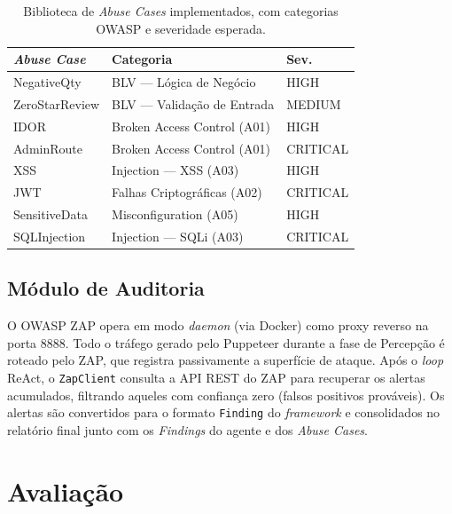 \documentclass[
    10pt,
    twocolumn,
    a4paper
]{article}
\begin{document}
\begin{table}[!htb]
\centering
\caption{Biblioteca de \textit{Abuse Cases} implementados, com
categorias OWASP e severidade esperada.\label{tab:abusecases}}
\small
\begin{tabularx}{\columnwidth}{lXl}
\toprule
\textbf{\textit{Abuse Case}} & \textbf{Categoria} & \textbf{Sev.} \\
\midrule
NegativeQty     & BLV — Lógica de Negócio          & HIGH     \\
ZeroStarReview  & BLV — Validação de Entrada        & MEDIUM   \\
IDOR            & Broken Access Control (A01)       & HIGH     \\
AdminRoute      & Broken Access Control (A01)       & CRITICAL \\
XSS             & Injection — XSS (A03)             & HIGH     \\
JWT             & Falhas Criptográficas (A02)       & CRITICAL \\
SensitiveData   & Misconfiguration (A05)            & HIGH     \\
SQLInjection    & Injection — SQLi (A03)            & CRITICAL \\
\bottomrule
\end{tabularx}
\end{table}

\subsection{Módulo de Auditoria}

O OWASP ZAP opera em modo \textit{daemon} (via Docker) como proxy
reverso na porta 8888. Todo o tráfego gerado pelo Puppeteer durante a
fase de Percepção é roteado pelo ZAP, que registra passivamente a
superfície de ataque. Após o \textit{loop} ReAct, o
\texttt{ZapClient} consulta a API REST do ZAP para recuperar os
alertas acumulados, filtrando aqueles com confiança zero (falsos
positivos prováveis). Os alertas são convertidos para o formato
\texttt{Finding} do \textit{framework} e consolidados no relatório
final junto com os \textit{Findings} do agente e dos \textit{Abuse Cases}.

\section{Avaliação}
\label{sec:avaliacao}
\end{document}
